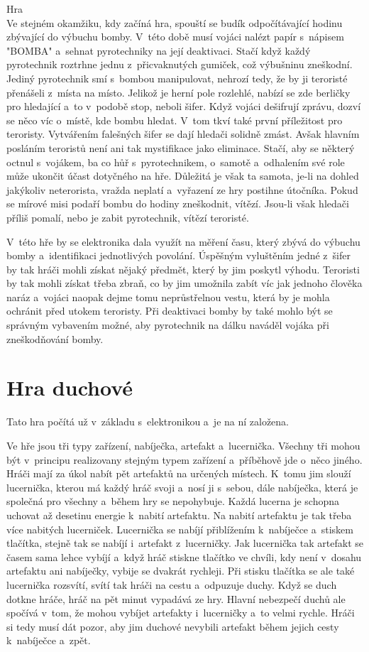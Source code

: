 Hra\\
Ve stejném okamžiku, kdy začíná hra, spouští se budík odpočítávající hodinu zbývající do výbuchu bomby. V~této době musí vojáci nalézt papír s~nápisem "BOMBA" a~sehnat pyrotechniky na její deaktivaci. Stačí když každý pyrotechnik roztrhne jednu z~přicvaknutých gumiček, což výbušninu zneškodní. Jediný pyrotechnik smí s~bombou manipulovat, nehrozí tedy, že by ji teroristé přenášeli z~místa na místo.
Jelikož je herní pole rozlehlé, nabízí se zde berličky pro hledající a~to v~podobě stop, neboli šifer. Když vojáci dešifrují zprávu, dozví se něco víc o~místě, kde bombu hledat. V~tom tkví také první příležitost pro teroristy. Vytvářením falešných šifer se dají hledači solidně zmást.
Avšak hlavním posláním teroristů není ani tak mystifikace jako eliminace. Stačí, aby se některý octnul s~vojákem, ba co hůř s~pyrotechnikem, o~samotě a~odhalením své role může ukončit účast dotyčného na hře. Důležitá je však ta samota, je-li na dohled jakýkoliv neterorista, vražda neplatí a~vyřazení ze hry postihne útočníka.
Pokud se mírové misi podaří bombu do hodiny zneškodnit, vítězí. Jsou-li však hledači příliš pomalí, nebo je zabit pyrotechnik, vítězí teroristé.

V~této hře by se elektronika dala využít na měření času, který zbývá do výbuchu bomby a~identifikaci jednotlivých povolání.
Úspěšným vyluštěním jedné z~šifer by tak hráči mohli získat nějaký předmět, který by jim poskytl výhodu.
Teroristi by tak mohli získat třeba zbraň, co by jim umožnila zabít víc jak jednoho člověka naráz a~vojáci naopak dejme tomu neprůstřelnou vestu, která by je mohla ochránit před utokem teroristy.
Při deaktivaci bomby by také mohlo být se správným vybavením možné, aby pyrotechnik na dálku naváděl vojáka při zneškodňování bomby.

\section{Hra duchové}
Tato hra počítá už v~základu s~elektronikou a~je na ní založena.

Ve hře jsou tři typy zařízení, nabíječka, artefakt a~lucernička.
Všechny tři mohou být v~principu realizovany stejným typem zařízení a~příběhově jde o~něco jiného.
Hráči mají za úkol nabít pět artefaktů na určených místech.
K~tomu jim slouží lucernička, kterou má každý hráč svoji a~nosí ji s~sebou, dále nabíječka, která je společná pro všechny a~během hry se nepohybuje.
Každá lucerna je schopna uchovat až desetinu energie k~nabití artefaktu. Na nabití artefaktu je tak třeba více nabitých lucerniček.
Lucernička se nabíjí přiblížením k~nabíječce a~stiskem tlačítka, stejně tak se nabíjí i~artefakt z~lucerničky.
Jak lucernička tak artefakt se časem sama lehce vybíjí a~když hráč stiskne tlačítko ve chvíli, kdy není v~dosahu artefaktu ani nabíječky, vybije se dvakrát rychleji.
Při stisku tlačítka se ale také lucernička rozsvítí, svítí tak hráči na cestu a~odpuzuje duchy.
Když se duch dotkne hráče, hráč na pět minut vypadává ze hry.
Hlavní nebezpečí duchů ale spočívá v~tom, že mohou vybíjet artefakty i~lucerničky a~to velmi rychle.
Hráči si tedy musí dát pozor, aby jim duchové nevybili artefakt během jejich cesty k~nabíječce a~zpět.

